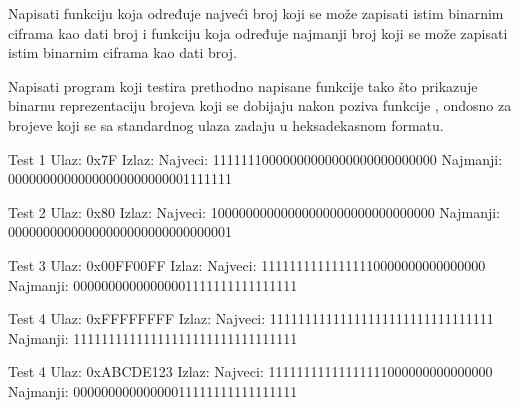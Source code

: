 \begin{Exercise}[label=203]
Napisati funkciju  koja određuje najveći broj koji se može zapisati istim binarnim ciframa kao dati broj i funkciju  koja određuje najmanji broj koji se može zapisati istim binarnim ciframa kao dati broj.

Napisati program koji testira prethodno napisane funkcije tako što prikazuje binarnu reprezentaciju brojeva koji se dobijaju nakon poziva funkcije , ondosno  za brojeve koji se sa standardnog ulaza zadaju u heksadekasnom formatu. 

\begin{miditest}
\begin{test}{Test 1}
Ulaz:   0x7F  
Izlaz:  
 Najveci:
 11111110000000000000000000000000  
 Najmanji:
 00000000000000000000000001111111
\end{test}
\end{miditest}
\begin{miditest}
\begin{test}{Test 2}
Ulaz:   0x80
Izlaz:  
 Najveci:
 10000000000000000000000000000000  
 Najmanji:
 00000000000000000000000000000001
\end{test}
\end{miditest}
\begin{miditest}
\begin{test}{Test 3}
Ulaz:   0x00FF00FF
Izlaz:  
 Najveci:
 11111111111111110000000000000000  
 Najmanji:
 00000000000000001111111111111111
\end{test}
\end{miditest}
\begin{miditest}
\begin{test}{Test 4}
Ulaz:   0xFFFFFFFF
Izlaz:  
 Najveci:
 11111111111111111111111111111111   
 Najmanji:
 11111111111111111111111111111111
\end{test}
\end{miditest}
\begin{miditest}
\begin{test}{Test 4}
Ulaz:   0xABCDE123
Izlaz:  
 Najveci:
 11111111111111111000000000000000  
 Najmanji:
 00000000000000011111111111111111
\end{test}
\end{miditest}

\end{Exercise}
\begin{Answer}[ref=203]
\end{Answer}


